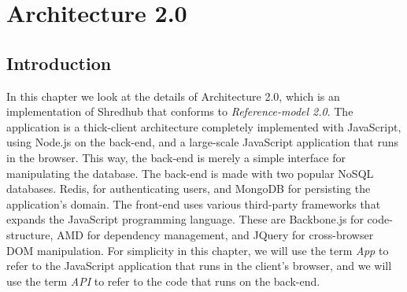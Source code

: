 \chapter{Architecture 2.0}

\section{Introduction}
In this chapter we look at the details of Architecture 2.0, which is an implementation of Shredhub that conforms to \textit{Reference-model 2.0}. The application is a thick-client architecture completely implemented with JavaScript, using Node.js on the back-end, and a large-scale JavaScript application that runs in the browser. This way, the back-end is merely a simple interface for manipulating the database. The back-end is made with two popular NoSQL databases. Redis, for authenticating users, and MongoDB for persisting the application's domain. The front-end uses various third-party frameworks that expands the JavaScript programming language. These are Backbone.js for code-structure, AMD for dependency management, and JQuery for cross-browser DOM manipulation. For simplicity in this chapter, we will use the term \textit{App} to refer to the JavaScript application that runs in the client's browser, and we will use the term \textit{API} to refer to the code that runs on the back-end. 

% 
%
% 
%	  
%		  
%		  	  
%		

